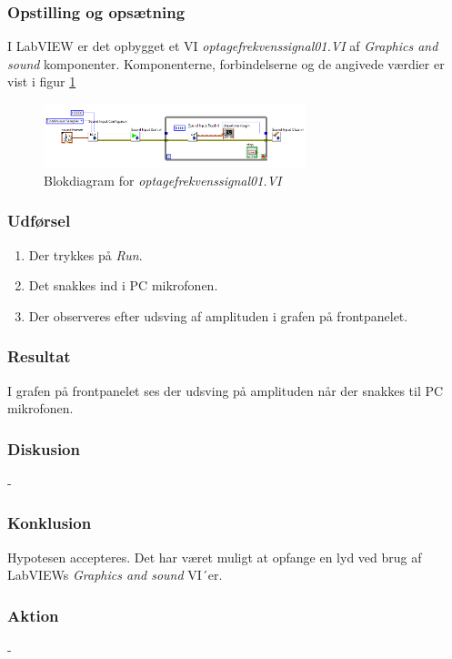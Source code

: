 \subsubsection{Opstilling og opsætning}

I LabVIEW er det opbygget et VI \textit{optagefrekvenssignal01.VI} af \textit{Graphics and sound} komponenter. Komponenterne, forbindelserne og de angivede værdier er vist i figur \ref{fig:of01}

\begin{figure}[htb]
			\centering
				\includegraphics[width=3in]{of01}
				\caption{Blokdiagram for \textit{optagefrekvenssignal01.VI}}	
				\label{fig:of01}
			\end{figure}

\subsubsection{Udførsel}
\begin{enumerate} 
				\item Der trykkes på \textit{Run}. 
				\item Det snakkes ind i PC mikrofonen.
				\item Der observeres efter udsving af amplituden i grafen på frontpanelet.  
			\end{enumerate}

\subsubsection{Resultat}
I grafen på frontpanelet ses der udsving på amplituden når der snakkes til PC mikrofonen. 
\subsubsection{Diskusion}
-
\subsubsection{Konklusion}
Hypotesen accepteres. Det har været muligt at opfange en lyd ved brug af LabVIEWs \textit{Graphics and sound} VI´er. 
\subsubsection{Aktion}
-

